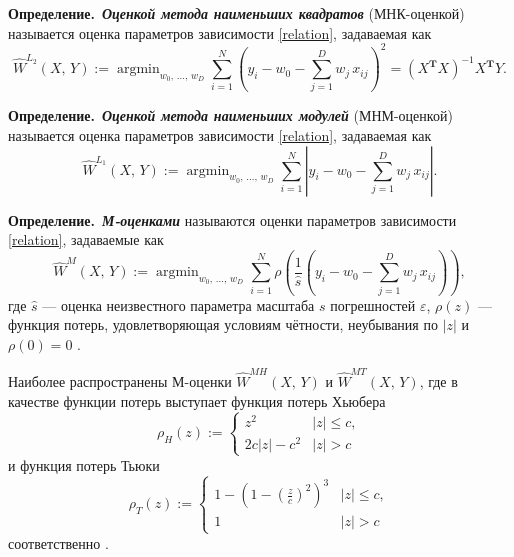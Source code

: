 \documentclass[12pt,a4paper]{article}
\newcommand{\tran}{\mathbf{T}}
\newcommand{\bi}[1]{\textbf{\textit{#1}}}
\newcommand{\definition}{\textbf{Определение.}}
\begin{document}
	\definition\ \bi{Оценкой метода наименьших квадратов} (МНК-оцен\-кой) называется оценка параметров зависимости \eqref{relation}, задаваемая как
	\begin{equation*}
		\widehat{W}^{L_2}(X,\,Y) := \mathop{\arg\min}_{ w_0, \, \ldots, \, w_D } \sum_{i=1}^{N} \left( y_i - w_0 - \sum_{j=1}^{D} w_j \, x_{ij} \right)^{\!2} = ( X^\tran X )^{-1} X^\tran Y.
	\end{equation*}
	
	\definition\ \bi{Оценкой метода наименьших модулей} (МНМ-оцен\-кой) называется оценка параметров зависимости \eqref{relation}, задаваемая как
	\begin{equation*}
		\widehat{W}^{L_1}(X,\,Y) := \mathop{\arg\min}_{ w_0, \, \ldots, \, w_D } \sum_{i=1}^{N} \left| y_i - w_0 - \sum_{j=1}^{D} w_j \, x_{ij} \right|\!.
	\end{equation*}

	\definition\ \bi{М-оценками} называются оценки параметров зависимости \eqref{relation}, задаваемые как
	\begin{equation*}
		\widehat{W}^{M}(X,\,Y) := \mathop{\arg\min}_{ w_0, \, \ldots, \, w_D } \sum_{i=1}^{N} \rho \left( \frac{1}{\widehat{s}} \left( y_i - w_0 - \sum_{j=1}^{D} w_j \, x_{ij} \right) \right)\!,
	\end{equation*}
	где $\widehat{s}$ --- оценка неизвестного параметра масштаба $s$ погрешностей $\varepsilon$, $\rho(z)$ --- функция потерь, удовлетворяющая условиям чётности, неубывания по $|z|$ и $\rho(0)=0$ \cite{reg}.
	
	Наиболее распространены М-оценки $\widehat{W}^{MH}(X,\,Y)$ и $\widehat{W}^{MT}(X,\,Y)$, где в качестве функции потерь выступает функция потерь Хьюбера
	\begin{equation*}
		\rho_H(z) := \begin{cases}
			z^2         & |z| \le c, \\
			2c|z| - c^2 & |z| > c
		\end{cases}
	\end{equation*}
	и функция потерь Тьюки
	\begin{equation*}
		\rho_T(z) := \begin{cases}
			1 - \left( 1 - \left( \frac{z}{c} \right)^{\!2} \right)^{\!3} & |z| \le c, \\
			1 & |z| > c
		\end{cases}
	\end{equation*}
	соответственно \cite{reg}.
	
\end{document}
